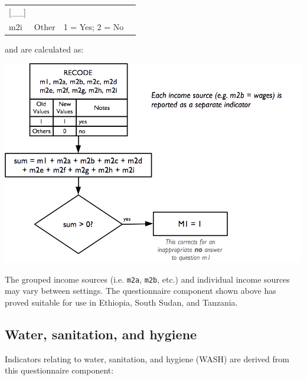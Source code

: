 \documentclass[12pt,a4paper]{book}
\theoremstyle{definition}
\theoremstyle{definition}
\theoremstyle{definition}
\theoremstyle{remark}
\begin{document}
\begin{longtable}[]{@{}llll@{}}
\begin{minipage}[t]{0.13\columnwidth}
{[}\_\_{]}\strut
\end{minipage}\tabularnewline
\begin{minipage}[t]{0.09\columnwidth}\raggedright
m2i\strut
\end{minipage} & \begin{minipage}[t]{0.41\columnwidth}\raggedright
Other\strut
\end{minipage} & \begin{minipage}[t]{0.25\columnwidth}\raggedright
1 = Yes; 2 = No\strut
\end{minipage} & \begin{minipage}[t]{0.13\columnwidth}\raggedright
\strut
\end{minipage}\tabularnewline
\bottomrule
\end{longtable}

and are calculated as:

\begin{center}\includegraphics[width=800pt]{figures/indicators23} \end{center}

The grouped income sources (i.e. \texttt{m2a}, \texttt{m2b}, etc.) and
individual income sources may vary between settings. The questionnaire
component shown above has proved suitable for use in Ethiopia, South
Sudan, and Tanzania.

\hypertarget{water-sanitation-and-hygiene}{%
\subsection{Water, sanitation, and
hygiene}\label{water-sanitation-and-hygiene}}

Indicators relating to water, sanitation, and hygiene (WASH) are derived
from this questionnaire component:
\end{document}
